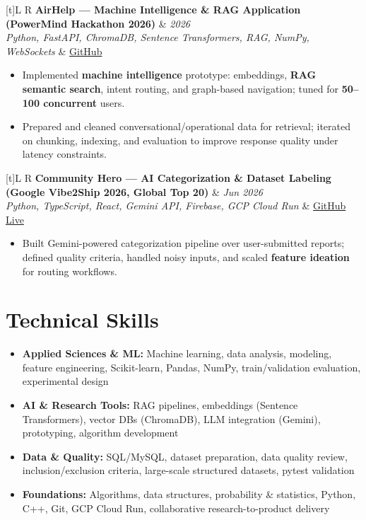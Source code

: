 \documentclass[a4paper,10pt]{article}
\newcommand{\resumeProject}[4]{%
  \vspace{0.5mm}
  \noindent
  \begin{tabularx}{\textwidth}[t]{L R}
    \textbf{#1} & \textit{#3} \\
    \textit{#2} & #4 \\
  \end{tabularx}
  \vspace{-0.5mm}%
}
\begin{document}
\resumeProject
  {AirHelp --- Machine Intelligence \& RAG Application (PowerMind Hackathon 2026)}
  {Python, FastAPI, ChromaDB, Sentence Transformers, RAG, NumPy, WebSockets}
  {2026}
  {\href{https://github.com/Ojas-Srivastava05/AirHelp-AI-Airport-Assistant}{GitHub}}
\begin{itemize}
  \item Implemented \textbf{machine intelligence} prototype: embeddings, \textbf{RAG semantic search}, intent routing, and graph-based navigation; tuned for \textbf{50--100 concurrent} users.
  \item Prepared and cleaned conversational/operational data for retrieval; iterated on chunking, indexing, and evaluation to improve response quality under latency constraints.
\end{itemize}

\resumeProject
  {Community Hero --- AI Categorization \& Dataset Labeling (Google Vibe2Ship 2026, Global Top 20)}
  {Python, TypeScript, React, Gemini API, Firebase, GCP Cloud Run}
  {Jun 2026}
  {\href{https://github.com/Ojas-Srivastava05/community-hero}{GitHub} \textbar{} \href{https://community-hero-987477089222.asia-south1.run.app/}{Live}}
\begin{itemize}
  \item Built Gemini-powered categorization pipeline over user-submitted reports; defined quality criteria, handled noisy inputs, and scaled \textbf{feature ideation} for routing workflows.
\end{itemize}

\section{Technical Skills}
\small
\begin{itemize}[label={}]
  \item \textbf{Applied Sciences \& ML:} Machine learning, data analysis, modeling, feature engineering, Scikit-learn, Pandas, NumPy, train/validation evaluation, experimental design
  \item \textbf{AI \& Research Tools:} RAG pipelines, embeddings (Sentence Transformers), vector DBs (ChromaDB), LLM integration (Gemini), prototyping, algorithm development
  \item \textbf{Data \& Quality:} SQL/MySQL, dataset preparation, data quality review, inclusion/exclusion criteria, large-scale structured datasets, pytest validation
  \item \textbf{Foundations:} Algorithms, data structures, probability \& statistics, Python, C++, Git, GCP Cloud Run, collaborative research-to-product delivery
\end{itemize}
\end{document}

